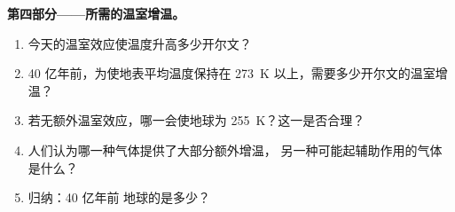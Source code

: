 \begin{problem}
\medskip
\noindent\textbf{第四部分——所需的温室增温。}
\begin{enumerate}[resume]
  \item 今天的温室效应使温度升高多少开尔文？
  \item 40 亿年前，为使地表平均温度保持在
        \qty{273}{K} 以上，需要多少开尔文的温室增温？
  \item 若无额外温室效应，哪一会使地球为
        \qty{255}{K}？这一是否合理？
  \item 人们认为哪一种气体提供了大部分额外增温，
        另一种可能起辅助作用的气体是什么？
  \item 归纳：40 亿年前
        地球的是多少？
\end{enumerate}
\end{problem}
